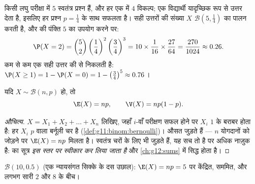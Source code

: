 \begin{example}\label{ex:g11:binom:quiz}
किसी लघु परीक्षा में $5$ स्वतंत्र प्रश्न हैं, और हर एक में $4$ विकल्प; एक
विद्यार्थी यादृच्छिक रूप से उत्तर देता है, इसलिए हर प्रश्न $p = \frac14$ के साथ सफलता
है। सही उत्तरों की संख्या $X$ $\mathcal B\left(5, \frac14\right)$ का पालन करती है, और  की
पंक्ति $5$ का उपयोग करने पर:
\[
\P(X = 2) = \binom52 \left(\frac14\right)^2\left(\frac34\right)^3
= 10 \times \frac{1}{16} \times \frac{27}{64}
= \frac{270}{1024} \approx 0.26 .
\]
कम से कम एक सही उत्तर की   से निकलती है: $\P(X \geq 1) = 1 - \P(X = 0) = 1 - \left(\frac34\right)^5 \approx
0.76$।
\end{example}

\begin{proposition}[प्रत्याशा और प्रसरण]\label{prop:g11:binom:expectation}
यदि $X \sim \mathcal B(n, p)$ हो, तो
\[
\E(X) = np,
\qquad
\V(X) = np(1-p).
\]
\end{proposition}

\begin{proof}[औचित्य]
$X = X_1 + X_2 + \dots + X_n$ लिखिए, जहाँ $i$-वाँ परीक्षण सफल होने पर $X_i$ $1$ के बराबर होता है:
हर $X_i$  $p$ वाला बर्नूली चर है (\cref{def:g11:binom:bernoulli})। औसत जुड़ते हैं --- $n$
योगदानों को जोड़ने पर $\E(X) = np$ मिलता है। स्वतंत्र चरों के लिए \emph{} भी
जुड़ते हैं, यह सच तो है पर अधिक नाज़ुक है:  का सूत्र \emph{इस स्तर पर
स्वीकार कर लिया जाता है} और \cref{ch:g12:sums} में सिद्ध होता है।
\end{proof}

\begin{omfigure}

{\small {} $\mathcal B(10, 0.5)$ (एक न्यायसंगत सिक्के के दस उछाल): $\E(X) = np = 5$ पर केंद्रित,
सममित, और लगभग सारी  $2$ और $8$ के बीच।}
\end{omfigure}

